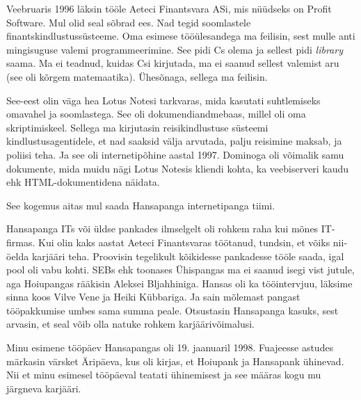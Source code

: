 
Veebruaris 1996 läksin tööle Aeteci
Finantsvara ASi, mis nüüdseks 
on Profit Software. Mul olid seal sõbrad ees. Nad tegid soomlastele 
finantskindlustussüsteeme. Oma esimese tööülesandega ma 
feilisin, sest mulle anti mingisuguse
valemi programmeerimine. See pidi Cs olema ja sellest pidi 
\emph{library} saama. Ma ei teadnud, kuidas Csi 
kirjutada, ma ei saanud sellest valemist aru (see oli kõrgem matemaatika). 
Ühesõnaga, sellega ma feilisin. 

See-eest olin väga hea Lotus 
Notesi tarkvaras, mida kasutati suhtlemiseks omavahel 
ja soomlastega. See oli dokumendiandmebaas, millel oli oma 
skriptimiskeel. Sellega ma kirjutasin reisikindlustuse süsteemi 
kindlustusagentidele, et nad saaksid välja arvutada, palju reisimine maksab, 
ja poliisi teha. Ja see oli internetipõhine aastal 1997. Dominoga 
oli võimalik samu dokumente, mida muidu nägi Lotus Notesis kliendi 
kohta, ka veebiserveri kaudu ehk HTML-dokumentidena näidata.

See kogemus aitas mul saada Hansapanga internetipanga 
tiimi.


Hansapanga ITs või üldse pankades ilmselgelt 
oli rohkem raha kui mõnes IT-firmas. Kui olin kaks aastat Aeteci
Finantsvaras töötanud, tundsin, et võiks nii-öelda karjääri teha. Proovisin tegelikult 
kõikidesse pankadesse tööle saada, igal pool oli vabu kohti. 
SEBs ehk toonases Ühispangas ma ei 
saanud isegi vist jutule, aga Hoiupangas rääkisin Aleksei 
Bljahhiniga. Hansas oli ka tööintervjuu, läksime sinna koos 
Vilve Vene ja Heiki Kübbariga. Ja sain mõlemast pangast tööpakkumise umbes sama summa peale. 
Otsustasin Hansapanga kasuks, sest arvasin, et seal võib olla natuke rohkem 
karjäärivõimalusi. 

Minu esimene tööpäev Hansapangas oli 
19. jaanuaril 1998. Fuajeesse astudes märkasin värsket 
Äripäeva, kus oli kirjas, et Hoiupank ja Hansapank ühinevad. Nii et minu 
esimesel tööpäeval teatati ühinemisest ja see määras kogu mu järgneva karjääri.



